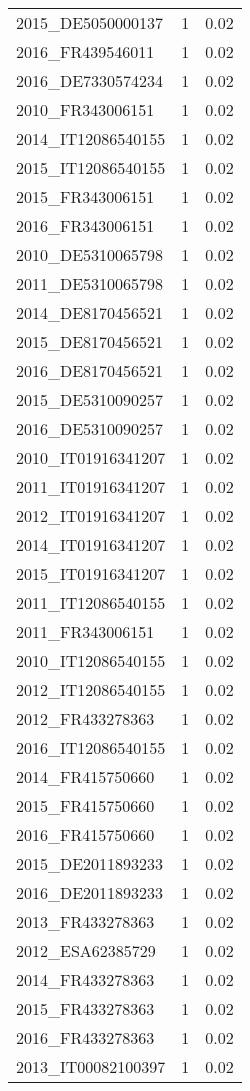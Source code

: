 \begin{table*}[htbp]
\begin{tabular}{lrr}
2015_DE5050000137 & 1 & 0.02 \\
2016_FR439546011 & 1 & 0.02 \\
2016_DE7330574234 & 1 & 0.02 \\
2010_FR343006151 & 1 & 0.02 \\
2014_IT12086540155 & 1 & 0.02 \\
2015_IT12086540155 & 1 & 0.02 \\
2015_FR343006151 & 1 & 0.02 \\
2016_FR343006151 & 1 & 0.02 \\
2010_DE5310065798 & 1 & 0.02 \\
2011_DE5310065798 & 1 & 0.02 \\
2014_DE8170456521 & 1 & 0.02 \\
2015_DE8170456521 & 1 & 0.02 \\
2016_DE8170456521 & 1 & 0.02 \\
2015_DE5310090257 & 1 & 0.02 \\
2016_DE5310090257 & 1 & 0.02 \\
2010_IT01916341207 & 1 & 0.02 \\
2011_IT01916341207 & 1 & 0.02 \\
2012_IT01916341207 & 1 & 0.02 \\
2014_IT01916341207 & 1 & 0.02 \\
2015_IT01916341207 & 1 & 0.02 \\
2011_IT12086540155 & 1 & 0.02 \\
2011_FR343006151 & 1 & 0.02 \\
2010_IT12086540155 & 1 & 0.02 \\
2012_IT12086540155 & 1 & 0.02 \\
2012_FR433278363 & 1 & 0.02 \\
2016_IT12086540155 & 1 & 0.02 \\
2014_FR415750660 & 1 & 0.02 \\
2015_FR415750660 & 1 & 0.02 \\
2016_FR415750660 & 1 & 0.02 \\
2015_DE2011893233 & 1 & 0.02 \\
2016_DE2011893233 & 1 & 0.02 \\
2013_FR433278363 & 1 & 0.02 \\
2012_ESA62385729 & 1 & 0.02 \\
2014_FR433278363 & 1 & 0.02 \\
2015_FR433278363 & 1 & 0.02 \\
2016_FR433278363 & 1 & 0.02 \\
2013_IT00082100397 & 1 & 0.02 \\

\end{tabular}
\end{table*}
